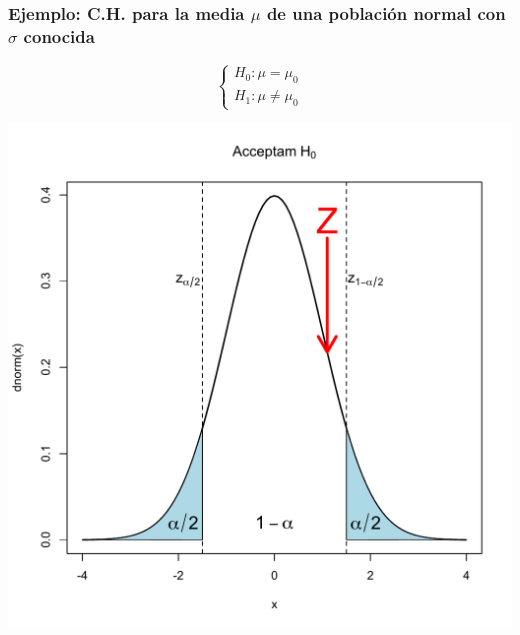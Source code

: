 \documentclass[12pt,t]{beamer}\usepackage[]{graphicx}\usepackage[]{color}
\theoremstyle{plain}
\theoremstyle{definition}
\begin{document}
\begin{frame}
\frametitle{Ejemplo: C.H. para la media   $\mu$ de una población   normal con $\sigma$ conocida}

\vspace*{-0.75cm}

$$
\left\{\begin{array}{l}
H_{0}:\mu=\mu_{0}\\ H_{1}:\mu\neq\mu_{0}
\end{array}
\right.
$$
\begin{center}
\includegraphics[width=0.7\linewidth]{acceptamH0z2.pdf}
\end{center}

\end{frame}
\end{document}
